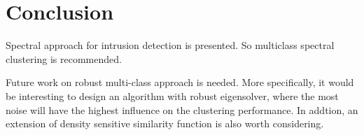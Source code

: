 \section{Conclusion}
Spectral approach for intrusion detection is presented. 
So multiclass spectral clustering is recommended. 

Future work on robust multi-class approach is needed. 
More specifically, it would be interesting to design an algorithm with robust eigensolver, where the most noise will have the highest influence on the clustering performance. 
In addtion, an extension of density sensitive similarity function is also worth considering. 
